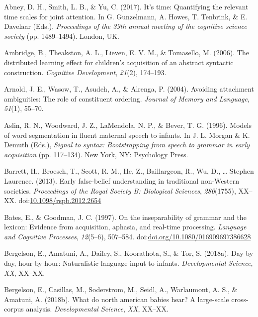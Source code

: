 \documentclass[floatsintext,man]{apa6}
\theoremstyle{definition}
\theoremstyle{definition}
\theoremstyle{definition}
\theoremstyle{remark}
\begin{document}
\hypertarget{ref-abney2017time}{}
Abney, D. H., Smith, L. B., \& Yu, C. (2017). It's time: Quantifying the
relevant time scales for joint attention. In G. Gunzelmann, A. Howes, T.
Tenbrink, \& E. Davelaar (Eds.), \emph{Proceedings of the 39th annual
meeting of the cognitive science society} (pp. 1489--1494). London, UK.

\hypertarget{ref-ambridge2006distributed}{}
Ambridge, B., Theakston, A. L., Lieven, E. V. M., \& Tomasello, M.
(2006). The distributed learning effect for children's acquisition of an
abstract syntactic construction. \emph{Cognitive Development},
\emph{21}(2), 174--193.

\hypertarget{ref-arnold2004avoiding}{}
Arnold, J. E., Wasow, T., Asudeh, A., \& Alrenga, P. (2004). Avoiding
attachment ambiguities: The role of constituent ordering. \emph{Journal
of Memory and Language}, \emph{51}(1), 55--70.

\hypertarget{ref-aslin1996models}{}
Aslin, R. N., Woodward, J. Z., LaMendola, N. P., \& Bever, T. G. (1996).
Models of word segmentation in fluent maternal speech to infants. In J.
L. Morgan \& K. Demuth (Eds.), \emph{Signal to syntax: Bootstrapping
from speech to grammar in early acquisition} (pp. 117--134). New York,
NY: Psychology Press.

\hypertarget{ref-barrett2013early}{}
Barrett, H., Broesch, T., Scott, R. M., He, Z., Baillargeon, R., Wu, D.,
\ldots{} Stephen Laurence. (2013). Early false-belief understanding in
traditional non-Western societies. \emph{Proceedings of the Royal
Society B: Biological Sciences}, \emph{280}(1755), XX--XX.
doi:\href{https://doi.org/10.1098/rspb.2012.2654}{10.1098/rspb.2012.2654}

\hypertarget{ref-bates1997inseparability}{}
Bates, E., \& Goodman, J. C. (1997). On the inseparability of grammar
and the lexicon: Evidence from acquisition, aphasia, and real-time
processing. \emph{Language and Cognitive Processes}, \emph{12}(5--6),
507--584.
doi:\href{https://doi.org/doi.org/10.1080/016909697386628}{doi.org/10.1080/016909697386628}

\hypertarget{ref-bergelson2018day}{}
Bergelson, E., Amatuni, A., Dailey, S., Koorathota, S., \& Tor, S.
(2018a). Day by day, hour by hour: Naturalistic language input to
infants. \emph{Developmental Science}, \emph{XX}, XX--XX.

\hypertarget{ref-bergelsoncasillas2018what}{}
Bergelson, E., Casillas, M., Soderstrom, M., Seidl, A., Warlaumont, A.
S., \& Amatuni, A. (2018b). What do north american babies hear? A
large-scale cross-corpus analysis. \emph{Developmental Science},
\emph{XX}, XX--XX.
\end{document}
